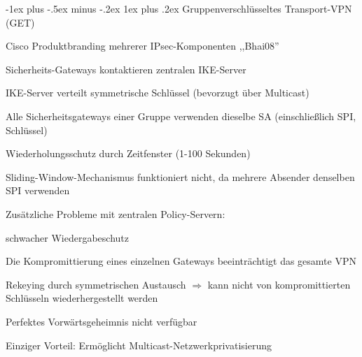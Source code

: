 \documentclass[a4paper]{article}
\makeatletter
\renewcommand{\subsubsection}{\@startsection{subsubsection}{3}{0mm}%
 {-1ex plus -.5ex minus -.2ex}%
 {1ex plus .2ex}%
 {\normalfont\small\bfseries}}
\makeatother
\begin{document}
\begin{multicols}{3}
      \subsubsection{Gruppenverschlüsseltes Transport-VPN (GET)}
      \begin{itemize*}
            \item Cisco Produktbranding mehrerer IPsec-Komponenten ,,Bhai08''
            \item Sicherheits-Gateways kontaktieren zentralen IKE-Server
            \item IKE-Server verteilt symmetrische Schlüssel (bevorzugt über Multicast)
            \item Alle Sicherheitsgateways einer Gruppe verwenden dieselbe SA (einschließlich SPI, Schlüssel)
            \item Wiederholungsschutz durch Zeitfenster (1-100 Sekunden)
            \begin{itemize*}
                  \item Sliding-Window-Mechanismus funktioniert nicht, da mehrere Absender denselben SPI verwenden
            \end{itemize*}
            \item Zusätzliche Probleme mit zentralen Policy-Servern:
            \begin{itemize*}
                  \item schwacher Wiedergabeschutz
                  \item Die Kompromittierung eines einzelnen Gateways beeinträchtigt das gesamte VPN
                  \item Rekeying durch symmetrischen Austausch $\Rightarrow$ kann nicht von kompromittierten Schlüsseln wiederhergestellt werden
                  \item Perfektes Vorwärtsgeheimnis nicht verfügbar
            \end{itemize*}
            \item Einziger Vorteil: Ermöglicht Multicast-Netzwerkprivatisierung
      \end{itemize*}


\end{multicols}
\end{document}
